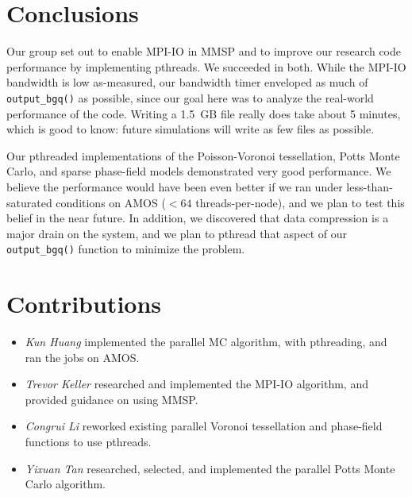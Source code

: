 \documentclass[11pt]{article}
\begin{document}
\begin{multicols*}{2}
\section{Conclusions}
Our group set out to enable MPI-IO in MMSP and to improve our research code performance by implementing pthreads.
We succeeded in both.
While the MPI-IO bandwidth is low as-measured, our bandwidth timer enveloped as much of \texttt{output\_bgq()} as possible, since our goal here was to analyze the real-world performance of the code.
Writing a 1.5~GB file really does take about 5 minutes, which is good to know:
future simulations will write as few files as possible.

Our pthreaded implementations of the Poisson-Voronoi tessellation, Potts Monte Carlo, and sparse phase-field models demonstrated very good performance.
We believe the performance would have been even better if we ran under less-than-saturated conditions on AMOS ($<64$ threads-per-node), and we plan to test this belief in the near future.
In addition, we discovered that data compression is a major drain on the system, and we plan to pthread that aspect of our \texttt{output\_bgq()} function to minimize the problem.

\section{Contributions}
\begin{itemize}
 \item \emph{Kun Huang} implemented the parallel MC algorithm, with pthreading, and ran the jobs on AMOS.
 \item \emph{Trevor Keller} researched and implemented the MPI-IO algorithm, and provided guidance on using MMSP.
 \item \emph{Congrui Li} reworked existing parallel Voronoi tessellation and phase-field functions to use pthreads.
 \item \emph{Yixuan Tan} researched, selected, and implemented the parallel Potts Monte Carlo algorithm.
\end{itemize}


\end{multicols*}
\end{document}
